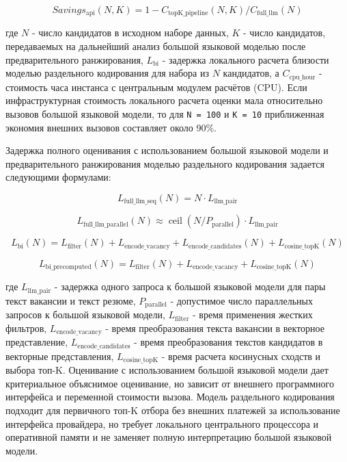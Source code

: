 \begin{equation}
\label{eq:savings_api-10}
Savings_{\text{api}}(N, K) = 1 - C_{\text{topK\_pipeline}}(N, K) / C_{\text{full\_llm}}(N)
\end{equation}

где $N$ - число кандидатов в исходном наборе данных, $K$ - число кандидатов, передаваемых на дальнейший анализ большой языковой моделью после предварительного ранжирования, $L_{\text{bi}}$ - задержка локального расчета близости моделью раздельного кодирования для набора из $N$ кандидатов, а $C_{\text{cpu\_hour}}$ - стоимость часа инстанса с центральным модулем расчётов (CPU). Если инфраструктурная стоимость локального расчета оценки мала относительно вызовов большой языковой модели, то для \texttt{N = 100} и \texttt{K = 10} приближенная экономия внешних вызовов составляет около 90\%.

Задержка полного оценивания с использованием большой языковой модели и предварительного ранжирования моделью раздельного кодирования задается следующими формулами:

\begin{equation}
\label{eq:l_full_llm_seq-11}
L_{\text{full\_llm\_seq}}(N) = N \cdot L_{\text{llm\_pair}}
\end{equation}

\begin{equation}
\label{eq:l_full_llm_parallel-12}
L_{\text{full\_llm\_parallel}}(N) \approx  \operatorname{ceil}(N / P_{\text{parallel}}) \cdot L_{\text{llm\_pair}}
\end{equation}

\begin{equation}
\label{eq:l_bi-13}
L_{\text{bi}}(N) = L_{\text{filter}}(N) + L_{\text{encode\_vacancy}} + L_{\text{encode\_candidates}}(N) + L_{\text{cosine\_topK}}(N)
\end{equation}

\begin{equation}
\label{eq:l_bi_precomputed-14}
L_{\text{bi\_precomputed}}(N) = L_{\text{filter}}(N) + L_{\text{encode\_vacancy}} + L_{\text{cosine\_topK}}(N)
\end{equation}

где $L_{\text{llm\_pair}}$ - задержка одного запроса к большой языковой модели для пары текст вакансии и текст резюме, $P_{\text{parallel}}$ - допустимое число параллельных запросов к большой языковой модели, $L_{\text{filter}}$ - время применения жестких фильтров, $L_{\text{encode\_vacancy}}$ - время преобразования текста вакансии в векторное представление, $L_{\text{encode\_candidates}}$ - время преобразования текстов кандидатов в векторные представления, $L_{\text{cosine\_topK}}$ - время расчета косинусных сходств и выбора топ-K. Оценивание с использованием большой языковой модели дает критериальное объяснимое оценивание, но зависит от внешнего программного интерфейса и переменной стоимости вызова. Модель раздельного кодирования подходит для первичного топ-K отбора без внешних платежей за использование интерфейса провайдера, но требует локального центрального процессора и оперативной памяти и не заменяет полную интерпретацию большой языковой модели.

